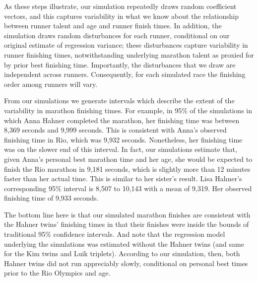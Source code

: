 \documentclass[12pt,titlepage]{article}
\begin{document}
As these steps illustrate, our simulation repeatedly draws random
coefficient vectors, and this captures variability in what we know
about the relationship between runner talent and age and runner finish
times.  In addition, the simulation draws random disturbances for each
runner, conditional on our original estimate of regression variance;
these disturbances capture variability in runner finishing times,
notwithstanding underlying marathon talent as proxied for by prior
best finishing time.  Importantly, the disturbances that we draw are
independent across runners.  Consequently, for each simulated race the
finishing order among runners will vary.

From our simulations we generate intervals which describe the extent
of the variability in marathon finishing times. For example, in 95\%
of the simulations in which Anna Hahner completed the marathon, her
finishing time was between 8,369 seconds and 9,999 seconds. This is
consistent with Anna's observed finishing time in Rio, which was 9,932
seconds. Nonetheless, her finishing time was on the slower end of this interval.   
In fact, our simulations estimate that, given Anna's personal best marathon time
and her age, she would be expected to finish the Rio marathon in 9,181 seconds, which is slightly more
than 12 minutes faster than her actual time.  This is similar to her sister's result. Lisa Hahner's
corresponding 95\% interval is 8,507 to 10,143 with a mean of 9,319.  Her observed
finishing time of 9,933 seconds.

The bottom line here is that our simulated marathon finishes are
consistent with the Hahner twins' finishing times in that their finishes were inside
the bounds of traditional 95\% confidence intervals. And note that the
regression model underlying the simulations was estimated without the
Hahner twins (and same for the Kim twins and Luik triplets). According
to our simulation, then, both Hahner twins did not run appreciably
slowly, conditional on personal best times prior to the Rio Olympics
and age.




\end{document}
